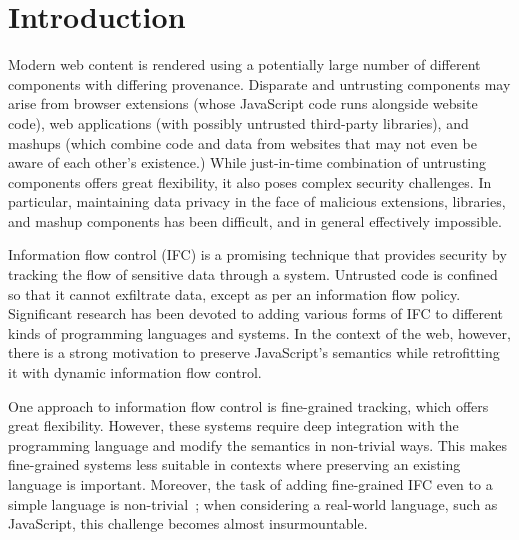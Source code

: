 \section{Introduction}
\label{sec:intro}

Modern web content is rendered using a potentially large number of
different components with differing provenance.
Disparate and untrusting components may arise from browser
extensions (whose JavaScript code runs alongside website
code), web applications (with possibly untrusted third-party
libraries), and mashups (which combine code and data from
websites that may not even be aware of each other's existence.)
While just-in-time combination of untrusting components
offers great flexibility, it also poses complex security challenges.
In particular, maintaining data privacy in the face of malicious
extensions, libraries, and mashup components has been difficult,
and in general effectively impossible.

Information flow control (IFC) is a promising technique
that provides security
by tracking the flow of sensitive data through a system.
Untrusted code is confined so that it cannot exfiltrate data, except as
per an information flow policy.  Significant research has been devoted to
adding various forms of IFC to different kinds of programming languages
and systems.  In the context of the web, however, there is a strong
motivation to preserve JavaScript's semantics while retrofitting it with dynamic information
flow control.

One approach to information flow control is fine-grained tracking,
which offers great flexibility.
However, these systems
require deep integration with the programming language and modify
the semantics in non-trivial ways.  This makes fine-grained systems
less suitable in contexts where preserving an existing language
is important.
%
Moreover, the task of adding fine-grained IFC even to a simple language is
non-trivial~\cite{hritcu2013testing}; when considering a real-world language,
such as JavaScript, this challenge becomes almost insurmountable.

